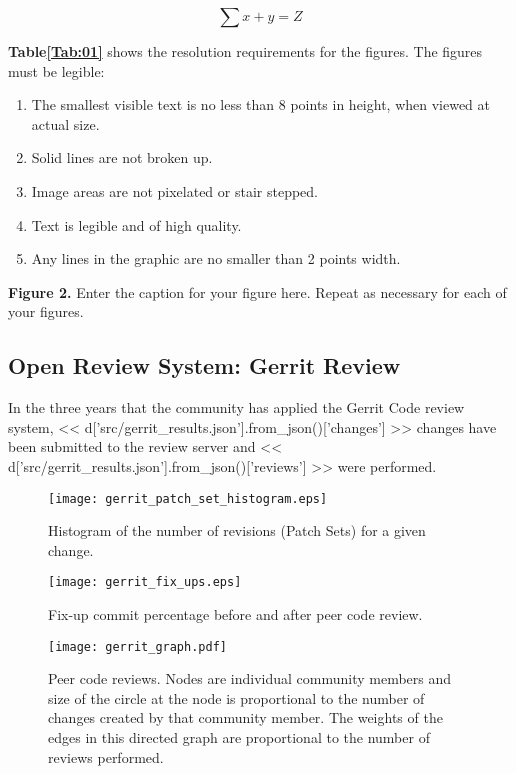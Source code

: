 \documentclass{frontiersENG} %
\begin{document}
\begin{equation}
\sum x+ y =Z\label{eq:01}
\end{equation}

\textbf{Table\ref{Tab:01}} shows the resolution requirements for the figures. The figures must be legible:
\begin{enumerate}
\item The smallest visible text is no less than 8 points in height, when viewed at actual size.
\item Solid lines are not broken up.
\item Image areas are not pixelated or stair stepped.
\item Text is legible and of high quality.
\item Any lines in the graphic are no smaller than 2 points width.
\end{enumerate}

\textbf{Figure 2.}{ Enter the caption for your figure here.  Repeat as  necessary for each of your figures.}\label{fig:02}

\subsection{Open Review System: Gerrit Review}

In the three years that the community has applied the Gerrit Code review
system, << d['src/gerrit_results.json'].from_json()['changes'] >> changes have
been submitted to the review server and
<< d['src/gerrit_results.json'].from_json()['reviews'] >> were performed.
 
\begin{figure}
  \centering
    \texttt{[image: gerrit\_patch\_set\_histogram.eps]}
    \caption{Histogram of the number of revisions (Patch Sets) for a given change.}
    \label{fig:gerrit_patch_set_histogram}
\end{figure}

\begin{figure}
  \centering
    \texttt{[image: gerrit\_fix\_ups.eps]}
    \caption{Fix-up commit percentage before and after peer code review.}
    \label{fig:gerrit_fix_ups}
\end{figure}

\begin{figure}
  \centering
    \showthe\textwidth
    \texttt{[image: gerrit\_graph.pdf]}
    \caption{Peer code reviews.  Nodes are individual community members and
      size of the circle at the node is proportional to the number of  changes
      created by that community member.  The weights of the edges in this directed
      graph are proportional to the number of reviews performed.}
    \label{fig:gerrit_fix_ups}
\end{figure}
\end{document}
